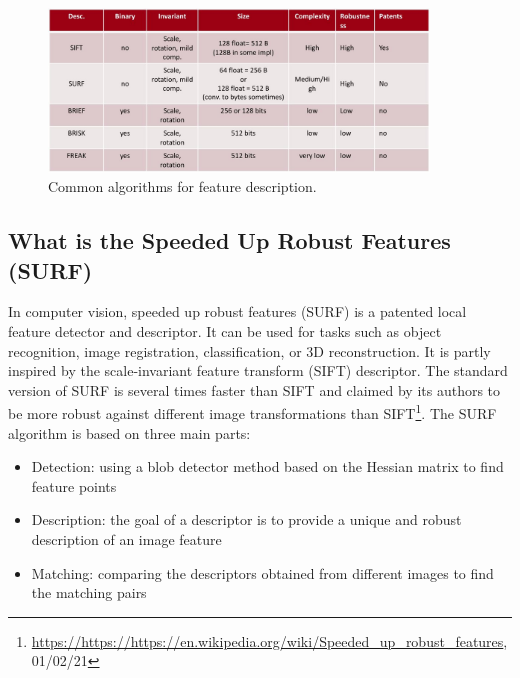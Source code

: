 \begin{figure}[h!]
    \centering
    \includegraphics[width=0.9\textwidth]{images/Descriptors.jpg}
    \caption{Common algorithms for feature description.}
    \label{fig:descriptors}    
\end{figure}


\subsection{What is the Speeded Up Robust Features (SURF)}
In computer vision, speeded up robust features (SURF) is a patented local feature detector and descriptor. It can be used for tasks such as object recognition, image registration, classification, or 3D reconstruction. It is partly inspired by the scale-invariant feature transform (SIFT) descriptor. The standard version of SURF is several times faster than SIFT and claimed by its authors to be more robust against different image transformations than SIFT\footnote{\url{https://https://https://en.wikipedia.org/wiki/Speeded_up_robust_features}, 01/02/21}. The SURF algorithm is based on three main parts:
\begin{itemize}
\item Detection: using a blob detector method based on the Hessian matrix to find feature points
\item Description: the goal of a descriptor is to provide a unique and robust description of an image feature
\item Matching: comparing the descriptors obtained from different images to find the matching pairs
\end{itemize}



